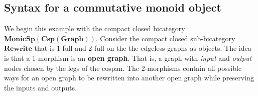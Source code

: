 \documentclass[11pt]{amsart}
\newcommand{\cat}[1]{\mathbf{#1}}
\newcommand{\bimonspcsp}[1]{\mathbf{MonicSp(Csp(#1))}}
\theoremstyle{remark}
\theoremstyle{definition}
\begin{document}
\subsection{Syntax for a commutative monoid object} %
\label{subsec:Rewrite}

We begin this example with the 
compact closed bicategory 
	$\bimonspcsp{Graph}$.  
Consider the compact closed sub-bicategory 
$\cat{Rewrite}$ that is 
1-full and 2-full on the 
the edgeless graphs as objects.
The idea is that a 1-morphism is 
an \textbf{open graph}.
That is, a graph with 
\emph{input} and \emph{output} nodes 
chosen by the legs of the cospan. 
The 2-morphisms contain 
all possible ways for an open graph 
to be rewritten into another open graph
while preserving the inputs and outputs. 
\end{document}
